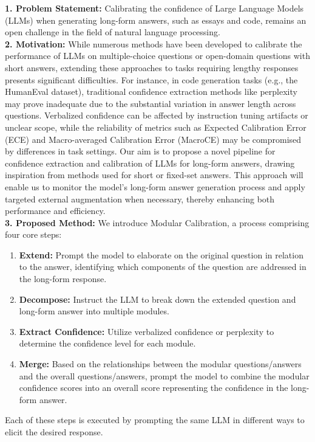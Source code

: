 \begin{tcolorbox}[colback=blue!5!white,colframe=blue!75!black,title=\textbf{Modular Calibration for Long-form Answers (Part 1)}]
    \small 
    \textbf{1. Problem Statement:} Calibrating the confidence of Large Language Models (LLMs) when generating long-form answers, such as essays and code, remains an open challenge in the field of natural language processing.
\\

    \textbf{2. Motivation:} While numerous methods have been developed to calibrate the performance of LLMs on multiple-choice questions or open-domain questions with short answers, extending these approaches to tasks requiring lengthy responses presents significant difficulties. For instance, in code generation tasks (e.g., the HumanEval dataset), traditional confidence extraction methods like perplexity may prove inadequate due to the substantial variation in answer length across questions. Verbalized confidence can be affected by instruction tuning artifacts or unclear scope, while the reliability of metrics such as Expected Calibration Error (ECE) and Macro-averaged Calibration Error (MacroCE) may be compromised by differences in task settings. Our aim is to propose a novel pipeline for confidence extraction and calibration of LLMs for long-form answers, drawing inspiration from methods used for short or fixed-set answers. This approach will enable us to monitor the model's long-form answer generation process and apply targeted external augmentation when necessary, thereby enhancing both performance and efficiency.
\\

    \textbf{3. Proposed Method:} We introduce Modular Calibration, a process comprising four core steps:
    \begin{enumerate}
        \item \textbf{Extend:} Prompt the model to elaborate on the original question in relation to the answer, identifying which components of the question are addressed in the long-form response.
        \item \textbf{Decompose:} Instruct the LLM to break down the extended question and long-form answer into multiple modules.
        \item \textbf{Extract Confidence:} Utilize verbalized confidence or perplexity to determine the confidence level for each module.
        \item \textbf{Merge:} Based on the relationships between the modular questions/answers and the overall questions/answers, prompt the model to combine the modular confidence scores into an overall score representing the confidence in the long-form answer.
    \end{enumerate}
    Each of these steps is executed by prompting the same LLM in different ways to elicit the desired response.
\\


\end{tcolorbox}
